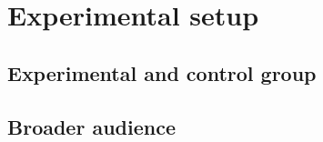 
\chapter{Experimental setup} %

\label{expe} %


\section{Experimental and control group}

\section{Broader audience}

